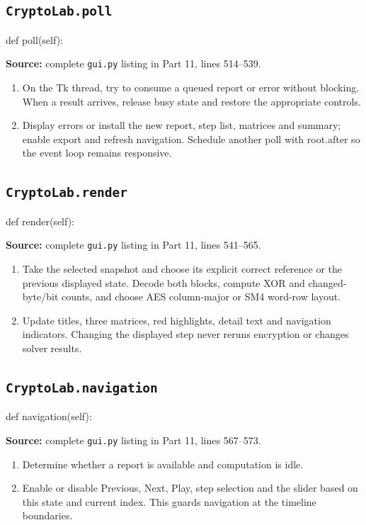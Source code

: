 \subsection{\texttt{CryptoLab.poll}}
\begin{lightcode}
def poll(self):
\end{lightcode}
\noindent\textbf{Source:} complete \texttt{gui.py} listing in Part 11, lines 514--539.
\begin{enumerate}
\item On the Tk thread, try to consume a queued report or error without blocking. When a result arrives, release busy state and restore the appropriate controls.
\item Display errors or install the new report, step list, matrices and summary; enable export and refresh navigation. Schedule another poll with root.after so the event loop remains responsive.
\end{enumerate}
\subsection{\texttt{CryptoLab.render}}
\begin{lightcode}
def render(self):
\end{lightcode}
\noindent\textbf{Source:} complete \texttt{gui.py} listing in Part 11, lines 541--565.
\begin{enumerate}
\item Take the selected snapshot and choose its explicit correct reference or the previous displayed state. Decode both blocks, compute XOR and changed-byte/bit counts, and choose AES column-major or SM4 word-row layout.
\item Update titles, three matrices, red highlights, detail text and navigation indicators. Changing the displayed step never reruns encryption or changes solver results.
\end{enumerate}
\subsection{\texttt{CryptoLab.navigation}}
\begin{lightcode}
def navigation(self):
\end{lightcode}
\noindent\textbf{Source:} complete \texttt{gui.py} listing in Part 11, lines 567--573.
\begin{enumerate}
\item Determine whether a report is available and computation is idle.
\item Enable or disable Previous, Next, Play, step selection and the slider based on this state and current index. This guards navigation at the timeline boundaries.
\end{enumerate}
